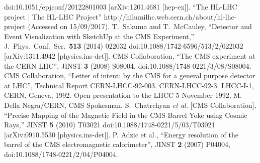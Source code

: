 \begin{thebibliography}{9}
  doi:10.1051/epjconf/20122801003
  [arXiv:1201.4681 [hep-ex]].
“The HL-LHC project | The HL-LHC Project”
http://hilumilhc.web.cern.ch/about/hl-lhc-project (Accessed on 15/09/2017).
T.~Sakuma and T.~McCauley,
  ``Detector and Event Visualization with SketchUp at the CMS Experiment,''
  J.\ Phys.\ Conf.\ Ser.\  {\bf 513} (2014) 022032
  doi:10.1088/1742-6596/513/2/022032
  [arXiv:1311.4942 [physics.ins-det]].
CMS Collaboration, “The CMS experiment at the CERN LHC”, JINST {\bf 3} (2008) S08004,
doi:10.1088/1748-0221/3/08/S08004.
CMS Collaboration, “Letter of intent: by the CMS for a general purpose detector at LHC”,
Technical Report CERN-LHCC-92-003. CERN-LHCC-92-3. LHCC-I-1, CERN, Geneva, 1992.
Open presentation to the LHCC 5 November 1992, M. Della Negra/CERN, CMS Spokesman.
  S.~Chatrchyan {\it et al.} [CMS Collaboration],
  ``Precise Mapping of the Magnetic Field in the CMS Barrel Yoke using Cosmic Rays,''
  JINST {\bf 5} (2010) T03021
  doi:10.1088/1748-0221/5/03/T03021
  [arXiv:0910.5530 [physics.ins-det]].
P. Adzic et al., “Energy resolution of the barrel of the CMS electromagnetic calorimeter”,
JINST \textbf{2} (2007) P04004, doi:10.1088/1748-0221/2/04/P04004.


\end{thebibliography}
